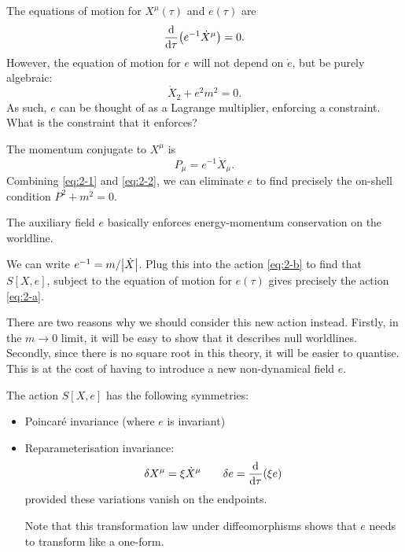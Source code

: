 The equations of motion for $X^{\mu}(\tau)$ and $e(\tau)$ are 
\begin{equation}
  \dv{\tau} (e^{-1} \dot{X}^{\mu}) = 0.
\end{equation}
However, the equation of motion for $e$  will not depend on $\dot{e}$, but be purely algebraic:
\begin{equation}
  \label{eq:2-1}
  \dot{X}_2 + e^2 m^2 = 0.
\end{equation}
As such, $e$ can be thought of as a Lagrange multiplier, enforcing a constraint.
What is the constraint that it enforces?

The momentum conjugate to $X^{\mu}$  is 
\begin{equation}
  \label{eq:2-2}
  P_{\mu} = e^{-1} \dot{X}_{\mu}.
\end{equation}
Combining \eqref{eq:2-1} and \eqref{eq:2-2}, we can eliminate $e$ to find precisely the on-shell condition $P^2 + m^2 = 0$.

\begin{leftbar}
  The auxiliary field $e$ basically enforces energy-momentum conservation on the worldline.
\end{leftbar}

\begin{exercise}
  We can write $e^{-1} = m / \abs{\dot{X}}$. Plug this into the action \eqref{eq:2-b} to find that $S[X, e]$, subject to the equation of motion for $e(\tau)$ gives precisely the action \eqref{eq:2-a}.
\end{exercise}
There are two reasons why we should consider this new action instead. Firstly, in the $m \to 0$ limit, it will be easy to show that it describes null worldlines. Secondly, since there is no square root in this theory, it will be easier to quantise.
This is at the cost of having to introduce a new non-dynamical field $e$.

The action $S[X, e]$ has the following symmetries:
\begin{itemize}
  \item Poincar\'e invariance (where $e$ is invariant)
  \item Reparameterisation invariance: 
    \begin{equation}
      \delta X^{\mu} = \xi \dot{X}^{\mu} \qquad \delta e = \dv{\tau} (\xi e)
    \end{equation} 
    provided these variations vanish on the endpoints.
    \begin{leftbar}
      Note that this transformation law under diffeomorphisms shows that $e$ needs to transform like a one-form.
    \end{leftbar}
\end{itemize}

